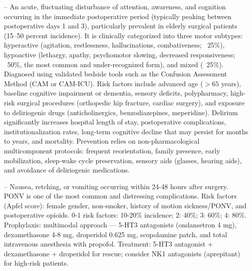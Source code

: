 -- An acute, fluctuating disturbance of attention, awareness, and cognition occurring in the immediate postoperative period (typically peaking between postoperative days 1 and 3), particularly prevalent in elderly surgical patients (15--50 percent incidence). It is clinically categorized into three motor subtypes: hyperactive (agitation, restlessness, hallucinations, combativeness; ~25\%), hypoactive (lethargy, apathy, psychomotor slowing, decreased responsiveness; ~50\%, the most common and under-recognized form), and mixed (~25\%). Diagnosed using validated bedside tools such as the Confusion Assessment Method (CAM or CAM-ICU). Risk factors include advanced age ($>65$ years), baseline cognitive impairment or dementia, sensory deficits, polypharmacy, high-risk surgical procedures (orthopedic hip fracture, cardiac surgery), and exposure to deliriogenic drugs (anticholinergics, benzodiazepines, meperidine). Delirium significantly increases hospital length of stay, postoperative complications, institutionalization rates, long-term cognitive decline that may persist for months to years, and mortality. Prevention relies on non-pharmacological multicomponent protocols: frequent reorientation, family presence, early mobilization, sleep-wake cycle preservation, sensory aids (glasses, hearing aids), and avoidance of deliriogenic medications.

-- Nausea, retching, or vomiting occurring within 24-48 hours after surgery. PONV is one of the most common and distressing complications. Risk factors (Apfel score): female gender, non-smoker, history of motion sickness/PONV, and postoperative opioids. 0-1 risk factors: 10-20\% incidence; 2: 40\%; 3: 60\%; 4: 80\%. Prophylaxis: multimodal approach — 5-HT3 antagonists (ondansetron 4 mg), dexamethasone 4-8 mg, droperidol 0.625 mg, scopolamine patch, and total intravenous anesthesia with propofol. Treatment: 5-HT3 antagonist + dexamethasone + droperidol for rescue; consider NK1 antagonists (aprepitant) for high-risk patients.


